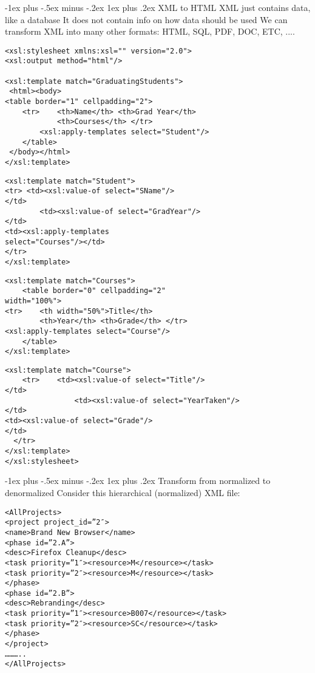 \documentclass[10pt,landscape]{article}
\makeatletter
\renewcommand{\subsubsection}{\@startsection{subsubsection}{3}{0mm}%
                                {-1ex plus -.5ex minus -.2ex}%
                                {1ex plus .2ex}%
                                {\normalfont\small\bfseries}}
\makeatother
\begin{document}
\begin{multicols}{3}
\subsubsection{XML to HTML}
XML just contains data, like a database
It does not contain info on how data should be used
We can transform XML into many other formats: HTML, SQL, PDF, DOC, ETC, ....

\begin{lstlisting}
<xsl:stylesheet xmlns:xsl="" version="2.0">
<xsl:output method="html"/>

<xsl:template match="GraduatingStudents">
 <html><body>
<table border="1" cellpadding="2">
	<tr>	<th>Name</th> <th>Grad Year</th>
			<th>Courses</th> </tr>
		<xsl:apply-templates select="Student"/>
 	</table>
 </body></html>
</xsl:template>
\end{lstlisting}




\begin{lstlisting}
<xsl:template match="Student">
<tr> <td><xsl:value-of select="SName"/>
</td>
		<td><xsl:value-of select="GradYear"/>
</td>
<td><xsl:apply-templates
select="Courses"/></td>
</tr>
</xsl:template>
\end{lstlisting}



\begin{lstlisting}
<xsl:template match="Courses">
	<table border="0" cellpadding="2"
width="100%">
<tr>	<th width="50%">Title</th>
		<th>Year</th> <th>Grade</th> </tr>
<xsl:apply-templates select="Course"/>
	</table>
</xsl:template>
\end{lstlisting}




\begin{lstlisting}
<xsl:template match="Course">
	<tr>	<td><xsl:value-of select="Title"/>
</td>
		 		<td><xsl:value-of select="YearTaken"/>
</td>
<td><xsl:value-of select="Grade"/>
</td>
  </tr>
</xsl:template>
</xsl:stylesheet>
\end{lstlisting}




\subsubsection{Transform from normalized to denormalized}
Consider this hierarchical (normalized) XML file:
\begin{lstlisting}
<AllProjects>
<project project_id=”2″>
<name>Brand New Browser</name>
<phase id=”2.A”>
<desc>Firefox Cleanup</desc>
<task priority=”1″><resource>M</resource></task>
<task priority=”2″><resource>M</resource></task>
</phase>
<phase id=”2.B”>
<desc>Rebranding</desc>
<task priority=”1″><resource>B007</resource></task>
<task priority=”2″><resource>SC</resource></task>
</phase>
</project>
………..
</AllProjects>
\end{lstlisting}



\end{multicols}
\end{document}
